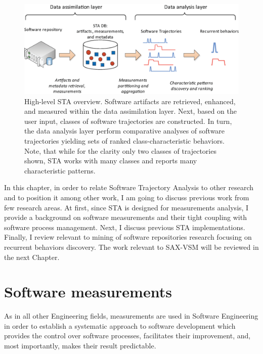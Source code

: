 \begin{figure}[h]
   \centering
   \includegraphics[width=150mm]{figures/Flow-analysis.eps}
   \caption{High-level STA overview. Software artifacts are retrieved, enhanced, and measured within the
   data assimilation layer. Next, based on the user input, classes of software trajectories are constructed.   
   In turn, the data analysis layer perform comparative analyses of software trajectories yielding sets
   of ranked class-characteristic behaviors.
   Note, that while for the clarity only two classes of trajectories shown, STA works with many classes and 
   reports many characteristic patterns.}
   \label{fig:sta-full-overview}
\end{figure}

In this chapter, in order to relate Software Trajectory Analysis to other research and to position it 
among other work, I am going to discuss previous work from few research areas. 
At first, since STA is designed for measurements analysis, I provide a background on software measurements 
and their tight coupling with software process management. 
Next, I discuss previous STA implementations. 
Finally, I review relevant to mining of software repositories research focusing on recurrent behaviors discovery.
The work relevant to SAX-VSM will be reviewed in the next Chapter.

\section{Software measurements}
As in all other Engineering fields, measurements are used in Software Engineering in order to establish a 
systematic approach to software development which provides the control over software processes, facilitates
their improvement, and, most importantly, makes their result predictable. 

